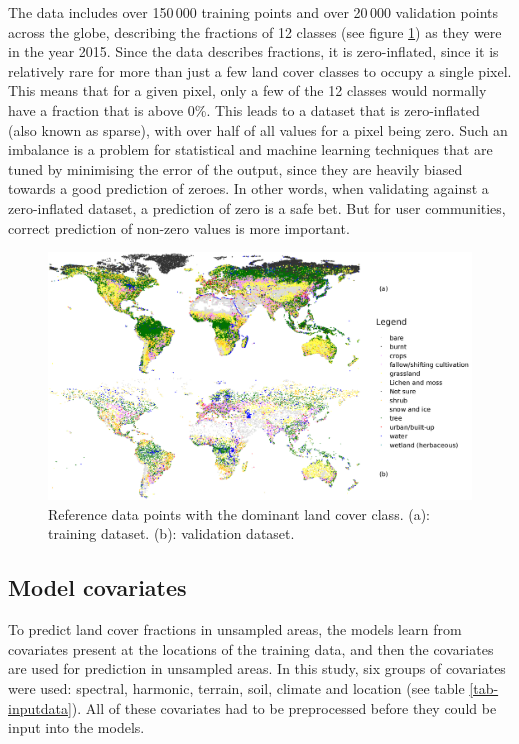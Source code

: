 \documentclass[a4paper,10pt]{article}
\begin{document}
The data includes over 150\,000 training points and over 20\,000 validation points across the globe, describing the fractions of 12 classes (see figure \ref{fig-reference-data}) as they were in the year 2015.
Since the data describes fractions, it is zero-inflated, since it is relatively rare for more than just a few land cover classes to occupy a single pixel.
This means that for a given pixel, only a few of the 12 classes would normally have a fraction that is above 0\%.
This leads to a dataset that is zero-inflated (also known as sparse), with over half of all values for a pixel being zero.
Such an imbalance is a problem for statistical and machine learning techniques that are tuned by minimising the error of the output, since they are heavily biased towards a good prediction of zeroes.
In other words, when validating against a zero-inflated dataset, a prediction of zero is a safe bet.
But for user communities, correct prediction of non-zero values is more important.

\begin{figure}
 \includegraphics[width=\textwidth]{article-figures/maps/2019-08-06-training-and-validation}
 \caption{Reference data points with the dominant land cover class. (a): training dataset. (b): validation dataset.}
 \label{fig-reference-data}
\end{figure}

\subsection{Model covariates}

To predict land cover fractions in unsampled areas, the models learn from covariates present at the locations of the training data, and then the covariates are used for prediction in unsampled areas.
In this study, six groups of covariates were used: spectral, harmonic, terrain, soil, climate and location (see table \ref{tab-inputdata}).
All of these covariates had to be preprocessed before they could be input into the models.
\end{document}
